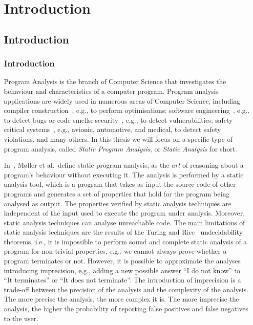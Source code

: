 \part{Introduction}
\chapter{Introduction}
\section{Introduction}

Program Analysis is the branch of Computer Science that investigates the behaviour
and characteristics of a computer program. Program analysis applications are widely
used in numerous areas of Computer Science, including compiler construction~\cite{aho2007compilers,appel2004modern},
e.g., to perform optimisations; software engineering~\cite{ayewah2008using,dura2021javadl,fink2012wala}, e.g., to detect bugs or
code smells; security~\cite{piskachev2021secucheck,flowDroid}, e.g., to detect vulnerabilities; safety
critical systems~\cite{cousot2005astree,Blanchet2002}, e.g., avionic, automotive, and medical, to detect safety
violations, and many others. In this thesis we will focus on a specific type of program analysis, called
\emph{Static Program Analysis}, or \emph{Static Analysis} for short.


In~\cite{spa}, M\o{}ller et al.~define 
static program analysis, as the \emph{art} of reasoning about a program's behaviour
without executing it. The analysis is performed by a static analysis tool,
which is a program that takes as input the source code of other programs and
generates a set of properties that hold for the program being analysed as output.
The properties verified by static analysis techniques are independent of the input
used to execute the program under analysis. Moreover, static analysis techniques can analyse unreachable code.
The main limitations of static analysis techniques are the results of the Turing and Rice~\cite{rice1953classes} undecidability
theorems, i.e., it is impossible to perform sound and complete static analysis of a program for non-trivial properties, e.g., 
we cannot always prove whether a program terminates or not. However, it is possible
to approximate the analyses introducing imprecision, e.g., adding a new possible answer
``I do not know'' to  ``It terminates'' or ``It does not terminate''. The introduction 
of imprecision is a trade-off between the precision of the analysis and the complexity
of the analysis. The more precise the analysis, the more complex it is. 
The more imprecise the analysis, the higher the probability of reporting 
false positives and false negatives to the user. 


